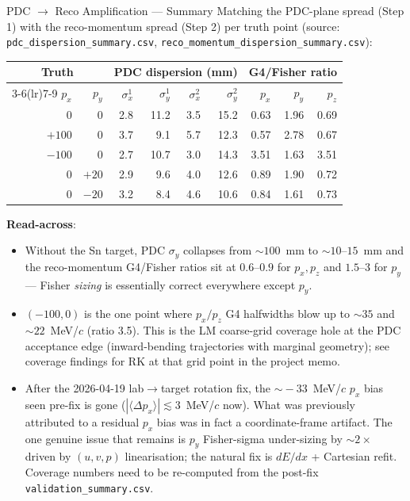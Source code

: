 \documentclass[aspectratio=169]{beamer}
\begin{document}
\begin{frame}{PDC $\to$ Reco Amplification --- Summary}
\small
Matching the PDC-plane spread (Step 1) with the reco-momentum spread (Step 2) per truth point (source: \texttt{pdc\_dispersion\_summary.csv}, \texttt{reco\_momentum\_dispersion\_summary.csv}):

\begin{table}[H]
\centering\scriptsize
\begin{tabular}{rr|rrrr|rrr}
\toprule
\multicolumn{2}{c}{Truth} & \multicolumn{4}{c}{PDC dispersion (mm)} & \multicolumn{3}{c}{G4/Fisher ratio} \\
\cmidrule(lr){3-6}\cmidrule(lr){7-9}
$p_x$ & $p_y$ & $\sigma^{1}_x$ & $\sigma^{1}_y$ & $\sigma^{2}_x$ & $\sigma^{2}_y$ & $p_x$ & $p_y$ & $p_z$ \\
\midrule
$0$    & $0$   & 2.8  & 11.2 & 3.5  & 15.2 & 0.63 & 1.96 & 0.69 \\
$+100$ & $0$   & 3.7  &  9.1 & 5.7  & 12.3 & 0.57 & 2.78 & 0.67 \\
$-100$ & $0$   & 2.7  & 10.7 & 3.0  & 14.3 & 3.51 & 1.63 & 3.51 \\
$0$    & $+20$ & 2.9  &  9.6 & 4.0  & 12.6 & 0.89 & 1.90 & 0.72 \\
$0$    & $-20$ & 3.2  &  8.4 & 4.6  & 10.6 & 0.84 & 1.61 & 0.73 \\
\bottomrule
\end{tabular}
\end{table}

\textbf{Read-across}:
\begin{itemize}
  \item Without the Sn target, PDC $\sigma_y$ collapses from ${\sim}100$~mm to ${\sim}10$--$15$~mm and the reco-momentum G4/Fisher ratios sit at $0.6$--$0.9$ for $p_x,p_z$ and $1.5$--$3$ for $p_y$ --- Fisher \emph{sizing} is essentially correct everywhere except $p_y$.
  \item $(-100, 0)$ is the one point where $p_x/p_z$ G4 halfwidths blow up to $\sim\!35$ and $\sim\!22$~MeV/$c$ (ratio 3.5). This is the LM coarse-grid coverage hole at the PDC acceptance edge (inward-bending trajectories with marginal geometry); see coverage findings for RK at that grid point in the project memo.
  \item After the 2026-04-19 lab$\to$target rotation fix, the $\sim\!-33$~MeV/$c$ $p_x$ bias seen pre-fix is gone ($|\langle\Delta p_x\rangle|\lesssim 3$~MeV/$c$ now). What was previously attributed to a residual $p_x$ bias was in fact a coordinate-frame artifact. The one genuine issue that remains is $p_y$ Fisher-sigma under-sizing by $\sim 2\times$ driven by $(u,v,p)$ linearisation; the natural fix is $dE/dx$ + Cartesian refit. Coverage numbers need to be re-computed from the post-fix \texttt{validation\_summary.csv}.
\end{itemize}
\end{frame}
\end{document}
